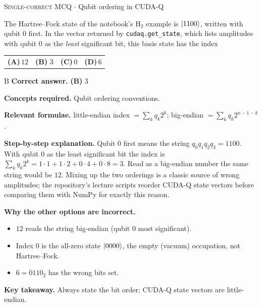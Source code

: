\documentclass[11pt,a4paper]{article}
\newcommand{\optlabel}[1]{\textbf{(#1)}}
\newcommand{\correctlabel}[1]{\textcolor{okgreen}{\textbf{(#1)}\,\ding{51}}}
\newenvironment{qitem}[1]{\begin{list}{}{\setlength{\leftmargin}{3.3em}\setlength{\labelwidth}{3.1em}%
  \setlength{\labelsep}{0.2em}\setlength{\topsep}{3pt}\setlength{\parsep}{3pt}}\item[\textbf{Q.#1}\hfill]}{\end{list}}
\newcommand{\qsep}{\par\vspace{2pt}{\color{black!15}\hrule}\vspace{4pt}}
\newcommand{\qmeta}[2]{{\footnotesize\color{black!60}\textsc{#1} \;$\cdot$\; #2}\par}
\begin{document}
\begin{qitem}{26}
\qmeta{Single-correct MCQ}{Qubit ordering in CUDA-Q}
The Hartree--Fock state of the notebook's H$_2$ example is $\ket{1100}$, written with qubit 0 first. In the vector returned by \texttt{cudaq.get\_state},
which lists amplitudes with qubit 0 as the \emph{least} significant bit, this basis state has the index
\par\smallskip\noindent\begin{tabularx}{\linewidth}{@{}*{4}{L}@{}}
\optlabel{A}\,$12$ & \correctlabel{B}\,$3$ & \optlabel{C}\,$0$ & \optlabel{D}\,$6$
\end{tabularx}
\end{qitem}
\begin{solbox}{B}
\textbf{\color{brand}Correct answer.} \textcolor{okgreen}{\textbf{(B)}} $3$

\textbf{\color{brand}Concepts required.} Qubit ordering conventions.

\textbf{\color{brand}Relevant formulae.} little-endian index $= \sum_kq_k2^k$; big-endian $= \sum_kq_k2^{n-1-k}$.

\textbf{\color{brand}Step-by-step explanation.} Qubit 0 first means the string $q_0q_1q_2q_3 = 1100$. With qubit 0 as the least significant bit the index is
$\sum_k q_k2^k = 1\cdot1 + 1\cdot2 + 0\cdot4 + 0\cdot8 = 3$. Read as a big-endian number the same string would be $12$. Mixing up the two
orderings is a classic source of wrong amplitudes; the repository's lecture scripts reorder CUDA-Q state vectors before comparing them
with NumPy for exactly this reason.

\textbf{\color{brand}Why the other options are incorrect.}
\begin{itemize}[leftmargin=2.4em, itemsep=1pt, topsep=2pt]
\item[\textbf{(A)}] $12$ reads the string big-endian (qubit 0 most significant).
\item[\textbf{(C)}] Index $0$ is the all-zero state $\ket{0000}$, the empty (vacuum) occupation, not Hartree--Fock.
\item[\textbf{(D)}] $6 = 0110_2$ has the wrong bits set.
\end{itemize}
\textbf{\color{brand}Key takeaway.} Always state the bit order; CUDA-Q state vectors are little-endian.
\end{solbox}
\qsep
\end{document}
